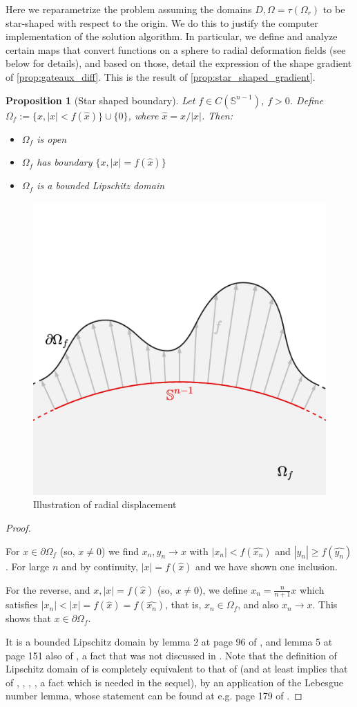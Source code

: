 \documentclass[english,a4paper,9pt,oneside]{scrbook}	%
\theoremstyle{break}
\newtheorem{prop}[equation]{Proposition}
\newenvironment{mproof}[1][\proofname]{%
  \begin{proof}[#1]$ $\par\nobreak\ignorespaces
}{%
  \end{proof}
}
\renewcommand*{\proofname}{Proof}
\theoremstyle{remark}
\newcommand{\mS}{\mathbb{S}^{n-1}}
\newcommand{\xh}{\hat{x}}
\begin{document}
Here we reparametrize the problem assuming the domains $D, \Omega=\tau(\Omega_r)$ to be star-shaped with respect to the origin. We do this to justify the computer implementation of the solution algorithm. In particular, we define and analyze certain maps that convert functions on a sphere to radial deformation fields (see below for details), and based on those, detail the expression of the shape gradient of \cref{prop:gateaux_diff}. This is the result of \cref{prop:star_shaped_gradient}.

\begin{prop}[Star shaped boundary]
Let $f \in C(\mS)$, $f>0$. Define $\Omega_f:=\{x, |x|<f(\xh)\}\cup\{0\}$, where $\xh=x/|x|$. Then:
\begin{itemize}
\item $\Omega_f$ is open
\item $\Omega_f$ has boundary $\{x, |x|=f(\xh)\}$
\item $\Omega_f$ is a bounded Lipschitz domain
\end{itemize}
\end{prop}

\begin{figure}[H]
\centering
\includegraphics[width=0.4\columnwidth]{Images/RadialDisplacement.pdf}
\caption{Illustration of radial displacement}\label{fig:star}
\end{figure}

\begin{mproof}

For $x \in \partial \Omega_f$ (so, $x\neq 0$) we find $x_n, y_n \rightarrow x$ with $|x_n|<f(\widehat{x_n})$ and $|y_n|\geq f(\widehat{y_n})$. For large $n$ and by continuity, $|x| = f(\xh)$ and we have shown one inclusion.

For the reverse, and $x, |x|=f(\xh)$ (so, $x\neq 0$), we define $x_n = \frac{n}{n+1} x$ which satisfies $|x_n|<|x|=f(\xh)=f(\widehat{x_n})$, that is, $x_n \in \Omega_f$, and also $x_n\rightarrow x$. This shows that $x \in \partial \Omega_f$.

It is a bounded Lipschitz domain by lemma 2 at page 96 of \cite{burenkov}, and lemma 5 at page 151 also of \cite{burenkov}, a fact that was not discussed in \cite{deckelnick}. Note that the definition of Lipschitz domain of \cite{burenkov} is completely equivalent to that of \cite{bello} (and at least implies that of \cite{mclean}, \cite{grisvard}, \cite{leoni}, \cite{adams}, a fact which is needed in the sequel), by an application of the Lebesgue number lemma, whose statement can be found at e.g. page 179 of \cite{munkres}.

\end{mproof}
\end{document}
